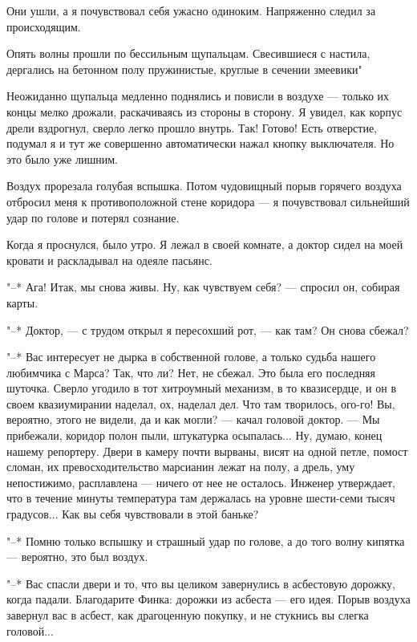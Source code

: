Они ушли, а я почувствовал себя ужасно одиноким. Напряженно  следил  за
происходящим.

Опять волны прошли по  бессильным  щупальцам.  Свесившиеся  с  настила,
дергались на бетонном полу пружинистые, круглые в сечении змеевики"

Неожиданно щупальца медленно поднялись и повисли в воздухе --- только  их
концы мелко дрожали, раскачиваясь из стороны  в  сторону.  Я  увидел,  как
корпус дрели вздрогнул, сверло легко  прошло  внутрь.  Так!  Готово!  Есть
отверстие, подумал я  и  тут  же  совершенно  автоматически  нажал  кнопку
выключателя. Но это было уже лишним.

Воздух прорезала  голубая  вспышка.  Потом  чудовищный  порыв  горячего
воздуха отбросил меня к противоположной стене коридора  ---  я  почувствовал
сильнейший удар по голове и потерял сознание.

\bigskip{}



Когда я проснулся, было утро. Я лежал в своей комнате, а  доктор  сидел
на моей кровати и раскладывал на одеяле пасьянс.

"--* Ага! Итак, мы снова живы. Ну,  как  чувствуем  себя?  ---  спросил  он,
собирая карты.

"--* Доктор, --- с трудом открыл я пересохший  рот,  ---  как  там?  Он  снова
сбежал?

"--* Вас интересует не дырка в собственной голове, а только судьба  нашего
любимчика с Марса? Так, что ли? Нет, не сбежал.  Это  была  его  последняя
шуточка. Сверло угодило в тот хитроумный механизм, в то квазисердце, и  он
в своем квазиумирании наделал, ох, наделал дел. Что там творилось, ого-го!
Вы, вероятно, этого не видели, да и как могли? --- качал головой  доктор.  ---
Мы прибежали, коридор полон пыли, штукатурка осыпалась... Ну, думаю, конец
нашему репортеру. Двери в камеру почти  вырваны,  висят  на  одной  петле,
помост сломан, их превосходительство марсианин лежат на полу, а дрель, уму
непостижимо, расплавлена --- ничего от нее не осталось. Инженер  утверждает,
что в течение минуты температура там держалась на уровне шести-семи  тысяч
градусов... Как вы себя чувствовали в этой баньке?

"--* Помню только вспышку и страшный удар  по  голове,  а  до  того  волну
кипятка --- вероятно, это был воздух.

"--* Вас спасли двери и  то,  что  вы  целиком  завернулись  в  асбестовую
дорожку, когда падали. Благодарите Финка: дорожки из асбеста ---  его  идея.
Порыв воздуха завернул  вас  в  асбест,  как  драгоценную  покупку,  и  не
стукнись вы слегка головой...


